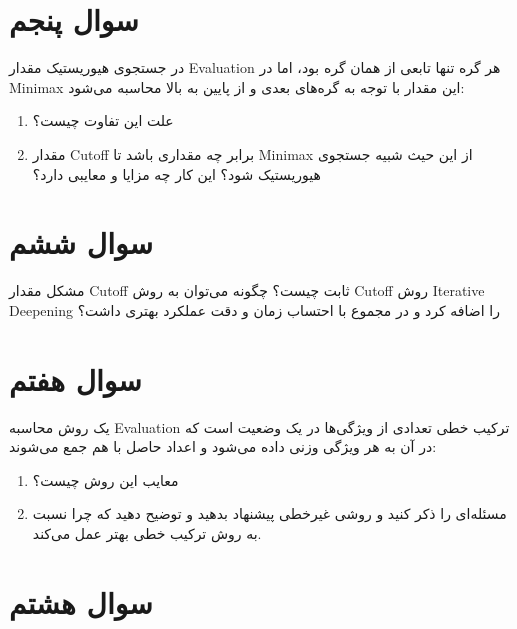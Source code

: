 \documentclass[a4paper,10pt]{article}
\begin{document}
	
	\bigskip
	\bigskip
	\hline
	
	
	\bigskip
	\section{سوال پنجم}
	
	در جستجوی هیوریستیک مقدار Evaluation هر گره تنها تابعی از همان گره بود، اما در Minimax این مقدار با توجه به گره‌های بعدی و از پایین به بالا محاسبه می‌شود:
	
	\begin{enumerate}[label=\alph*)]
		\item علت این تفاوت چیست؟
		
		\item مقدار Cutoff برابر چه مقداری باشد تا Minimax از این حیث شبیه جستجوی هیوریستیک شود؟ این کار چه مزایا و معایبی دارد؟
	\end{enumerate}
	
	\bigskip
	\bigskip
	\hline
	
	
	
	\bigskip
	\section{سوال ششم}
	
	مشکل مقدار Cutoff ثابت چیست؟ چگونه می‌توان به روش Cutoff  روش Iterative Deepening را اضافه کرد و در مجموع با احتساب زمان و دقت عملکرد بهتری داشت؟
	
	\bigskip
	\bigskip
	\hline
	
	
	\bigskip
	\section{سوال هفتم}
	
	یک روش محاسبه Evaluation ترکیب خطی تعدادی از ویژگی‌ها در یک وضعیت است که در آن به هر ویژگی وزنی داده می‌شود و اعداد حاصل با هم جمع می‌شوند:
	
	\begin{enumerate}[label=\alph*)]
		\item معایب این روش چیست؟
		
		\item مسئله‌ای را ذکر کنید و روشی غیرخطی پیشنهاد بدهید و توضیح دهید که چرا نسبت به روش ترکیب خطی بهتر عمل می‌کند.
	\end{enumerate}
	

	\bigskip
	\bigskip
 	\hline
	
	
	\bigskip
	\section{سوال هشتم}
	
\end{document}
